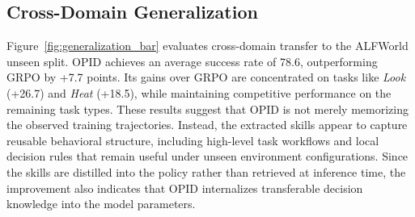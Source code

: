 \documentclass{llmxive}
\begin{document}
\subsection{Cross-Domain Generalization}\label{subsec34_cross_domain_generalization}
Figure~\ref{fig:generalization_bar} evaluates cross-domain transfer to the ALFWorld unseen split. OPID achieves an average success rate of 78.6, outperforming GRPO by +7.7 points. Its gains over GRPO are concentrated on tasks like \textit{Look} (+26.7) and \textit{Heat} (+18.5), while maintaining competitive performance on the remaining task types. These results suggest that OPID is not merely memorizing the observed training trajectories. Instead, the extracted skills appear to capture reusable behavioral structure, including high-level task workflows and local decision rules that remain useful under unseen environment configurations. Since the skills are distilled into the policy rather than retrieved at inference time, the improvement also indicates that OPID internalizes transferable decision knowledge into the model parameters.
\end{document}
